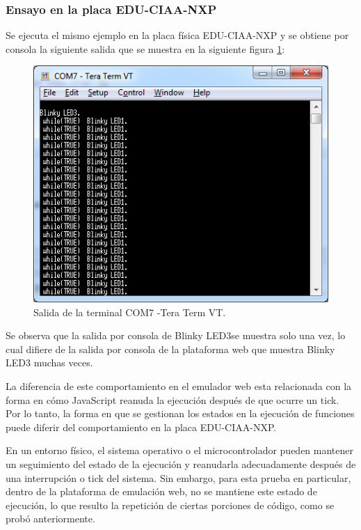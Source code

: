 \subsubsection{Ensayo en la placa EDU-CIAA-NXP} 

Se ejecuta el mismo ejemplo en la placa física EDU-CIAA-NXP y se obtiene por consola la siguiente salida que se muestra en la siguiente figura \ref{fig:TesttickhookPlaca}:


\begin{figure}[ht]
	\centering
	\includegraphics[scale=.80]{./Figures/TesttickhookPlaca.png}
	\caption{Salida de la terminal COM7 -Tera Term VT.}
	\label{fig:TesttickhookPlaca}
\end{figure}

\hfill \break
\hfill \break
\hfill \break
\hfill \break
\hfill \break
\hfill \break
\hfill \break
\hfill \break
\hfill \break
\hfill \break
\hfill \break
\hfill \break
\hfill \break
Se observa que la salida por consola de \textquotedbl Blinky LED3\textquotedbl se muestra solo una vez, lo cual difiere de la salida por consola de la plataforma web que muestra \textquotedbl Blinky LED3\textquotedbl{} muchas veces.

La diferencia de este comportamiento en el emulador web esta relacionada con la forma en cómo JavaScript reanuda la ejecución después de que ocurre un tick. Por lo tanto, la forma en que se gestionan los estados en la ejecución de funciones puede diferir del comportamiento en la placa EDU-CIAA-NXP.

En un entorno físico, el sistema operativo o el microcontrolador pueden mantener un seguimiento del estado de la ejecución y reanudarla adecuadamente después de una interrupción o tick del sistema. Sin embargo, para esta prueba en particular, dentro de la plataforma de emulación web, no se mantiene este estado de ejecución, lo que resulto la repetición de ciertas porciones de código, como se probó anteriormente.

